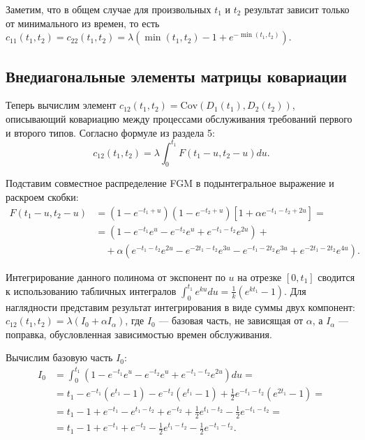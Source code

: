 \documentclass[12pt]{article}
\theoremstyle{plain}
\theoremstyle{definition}
\theoremstyle{remark}
\begin{document}
Заметим, что в общем случае для произвольных $t_1$ и $t_2$ результат зависит только от минимального из времен, то есть $c_{11}(t_1, t_2) = c_{22}(t_1, t_2) = \lambda (\min(t_1, t_2) - 1 + e^{-\min(t_1, t_2)})$.

\subsection{Внедиагональные элементы матрицы ковариации}
Теперь вычислим элемент $c_{12}(t_1, t_2) = \text{Cov}(D_1(t_1), D_2(t_2))$, описывающий ковариацию между процессами обслуживания требований первого и второго типов. Согласно формуле из раздела 5:
\begin{equation}
    c_{12}(t_1, t_2) = \lambda \int_0^{t_1} F(t_1-u, t_2-u) du.
\end{equation}

Подставим совместное распределение FGM в подынтегральное выражение и раскроем скобки:
\begin{align*}
    F(t_1-u, t_2-u) &= \left(1 - e^{-t_1+u}\right)\left(1 - e^{-t_2+u}\right) \left[ 1 + \alpha e^{-t_1-t_2+2u} \right] = \\
    &= \left( 1 - e^{-t_1}e^u - e^{-t_2}e^u + e^{-t_1-t_2}e^{2u} \right) + \\
    &\quad + \alpha \left( e^{-t_1-t_2}e^{2u} - e^{-2t_1-t_2}e^{3u} - e^{-t_1-2t_2}e^{3u} + e^{-2t_1-2t_2}e^{4u} \right).
\end{align*}

Интегрирование данного полинома от экспонент по $u$ на отрезке $[0, t_1]$ сводится к использованию табличных интегралов $\int_0^{t_1} e^{ku} du = \frac{1}{k}(e^{kt_1} - 1)$. Для наглядности представим результат интегрирования в виде суммы двух компонент: $c_{12}(t_1, t_2) = \lambda \left( I_0 + \alpha I_\alpha \right)$, где $I_0$ — базовая часть, не зависящая от $\alpha$, а $I_\alpha$ — поправка, обусловленная зависимостью времен обслуживания.

Вычислим базовую часть $I_0$:
\begin{align*}
    I_0 &= \int_0^{t_1} \left( 1 - e^{-t_1}e^u - e^{-t_2}e^u + e^{-t_1-t_2}e^{2u} \right) du = \\
    &= t_1 - e^{-t_1}(e^{t_1}-1) - e^{-t_2}(e^{t_1}-1) + \frac{1}{2}e^{-t_1-t_2}(e^{2t_1}-1) = \\
    &= t_1 - 1 + e^{-t_1} - e^{t_1-t_2} + e^{-t_2} + \frac{1}{2}e^{t_1-t_2} - \frac{1}{2}e^{-t_1-t_2} = \\
    &= t_1 - 1 + e^{-t_1} + e^{-t_2} - \frac{1}{2}e^{t_1-t_2} - \frac{1}{2}e^{-t_1-t_2}.
\end{align*}
\end{document}
